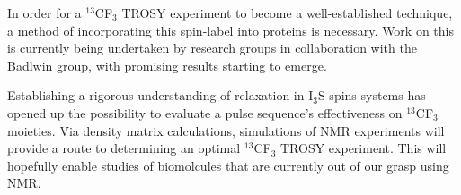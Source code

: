 In order for a $^{13}$CF$_3$ TROSY experiment to become a well-established technique, a method of incorporating this spin-label into proteins is necessary. Work on this is currently being undertaken by research groups in collaboration with the Badlwin group, with promising results starting to emerge\cite{RN55,RN19}.

Establishing a rigorous understanding of relaxation in I$_3$S spins systems has opened up the possibility to evaluate a pulse sequence's effectiveness on $^{13}$CF$_3$ moieties. Via density matrix calculations, simulations of NMR experiments will provide a route to determining an optimal $^{13}$CF$_3$ TROSY experiment. This will hopefully enable studies of biomolcules that are currently out of our grasp using NMR.
